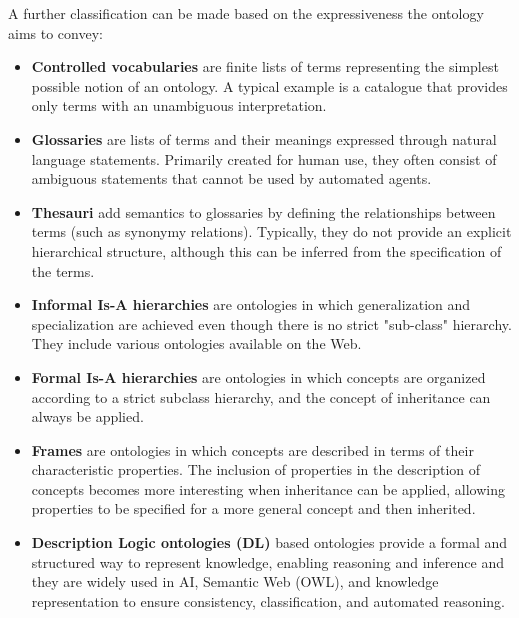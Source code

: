 A further classification can be made based on the expressiveness the ontology aims to convey:
\begin{itemize}
    \item \textbf{Controlled vocabularies} are finite lists of terms representing the simplest possible notion of an ontology. A typical example is a catalogue that provides only terms with an unambiguous interpretation.

    \item \textbf{Glossaries} are lists of terms and their meanings expressed through natural language statements. Primarily created for human use, they often consist of ambiguous statements that cannot be used by automated agents.

    \item \textbf{Thesauri} add semantics to glossaries by defining the relationships between terms (such as synonymy relations). Typically, they do not provide an explicit hierarchical structure, although this can be inferred from the specification of the terms.

    \item \textbf{Informal Is-A hierarchies} are ontologies in which generalization and specialization are achieved even though there is no strict "sub-class" hierarchy. They include various ontologies available on the Web.

    \item \textbf{Formal Is-A hierarchies} are ontologies in which concepts are organized according to a strict subclass hierarchy, and the concept of inheritance can always be applied.

    \item \textbf{Frames} are ontologies in which concepts are described in terms of their characteristic properties. The inclusion of properties in the description of concepts becomes more interesting when inheritance can be applied, allowing properties to be specified for a more general concept and then inherited.

   \item \textbf{Description Logic ontologies (DL)} based ontologies provide a formal and structured way to represent knowledge, enabling reasoning and inference and they are widely used in AI, Semantic Web (OWL), and knowledge representation to ensure consistency, classification, and automated reasoning.
\end{itemize}

